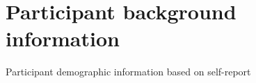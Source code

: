 \documentclass[review]{elsarticle} %
\begin{document}
\clearpage

\appendix

\hypertarget{participant-background-information}{%
\section{Participant background
information}\label{participant-background-information}}

\label{section:a}

\begin{table}[hbt!]

\begin{center}
\begin{threeparttable}

\caption{\label{tab:unnamed-chunk-2}Participant demographic information based on self-report}

\small{

}
\end{threeparttable}
\end{center}
\end{table}
\end{document}
